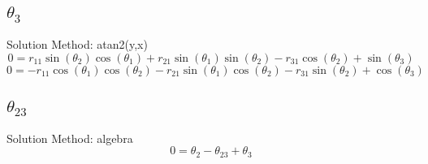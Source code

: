 \subsection{$\theta_{3}$ }
Solution Method:  atan2(y,x)
\begin{dmath}
0 = r_{11} \sin{\left (\theta_{2} \right )} \cos{\left (\theta_{1} \right )} + r_{21} \sin{\left (\theta_{1} \right )} \sin{\left (\theta_{2} \right )} - r_{31} \cos{\left (\theta_{2} \right )} + \sin{\left (\theta_{3} \right )}
\end{dmath}
\begin{dmath}
0 = - r_{11} \cos{\left (\theta_{1} \right )} \cos{\left (\theta_{2} \right )} - r_{21} \sin{\left (\theta_{1} \right )} \cos{\left (\theta_{2} \right )} - r_{31} \sin{\left (\theta_{2} \right )} + \cos{\left (\theta_{3} \right )}
\end{dmath}
\subsection{$\theta_{23}$ }
Solution Method:  algebra
\begin{dmath}
0 = \theta_{2} - \theta_{23} + \theta_{3}
\end{dmath}
